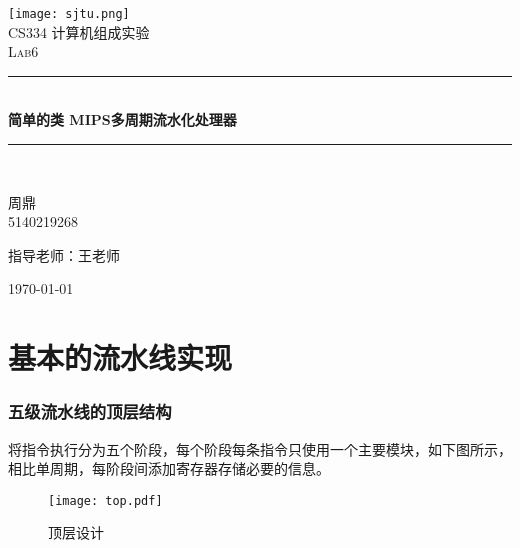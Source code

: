 \documentclass[a4paper]{article}
\newcommand{\HRule}{\rule{\linewidth}{0.5mm}}
\begin{document}
\begin{titlepage} 
    \begin{center} %
    \texttt{[image: sjtu.png]}\\[1cm] 
    \textsc{\LARGE CS334 计算机组成实验}\\[1.5cm] 
    \textsc{\Large Lab6}\\[0.5cm] %
    \HRule \\[0.4cm] { \huge \bfseries 简单的类 MIPS多周期流水化处理器}\\[0.4cm] 
    \HRule \\[1.5cm] %
    \begin{minipage}{0.4\textwidth} 
        \begin{flushleft} 
        \large 
        周鼎\\
        5140219268
        \end{flushleft} 
        \end{minipage} 
        \begin{minipage}{0.4\textwidth} 
        \begin{flushright} 
        \large 
        指导老师：王老师
        \end{flushright} 
        \end{minipage} 
        \vfill %
        {\large \today} 
    \end{center} 
\end{titlepage}


\newpage
\tableofcontents

\newpage
\part{基本的流水线实现}
\section{五级流水线的顶层结构}
将指令执行分为五个阶段，每个阶段每条指令只使用一个主要模块，如下图所示，相比单周期，每阶段间添加寄存器存储必要的信息。
\begin{figure}[h]
  \centering
  \texttt{[image: top.pdf]}
  \caption{顶层设计}\label{TOP}
\end{figure}
\end{document}
